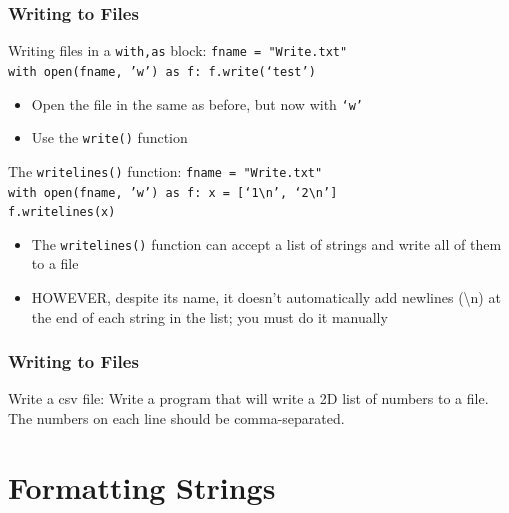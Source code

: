 \documentclass{beamer}
\newcommand{\code}[1]{\texttt{#1}}
\newcommand{\tab}{\hspace*{22pt}}
\begin{document}
\begin{frame}	
	\frametitle{Writing to Files}
	
	\begin{block}{Writing files in a \code{with,as} block:}
			\code{fname = "Write.txt" \\
					with open(fname, 'w') as f:
					\tab f.write(`test')
			}
		\endminipage\hfill
			\begin{itemize}
				\item Open the file in the same as before, but now with \code{`w'}
				\item Use the \code{write()} function
			\end{itemize}
		\endminipage\hfill
	\end{block}
	
	\begin{block}{The \code{writelines()} function:}
			\code{fname = "Write.txt" \\
					with open(fname, 'w') as f:
					\tab x = [`1\textbackslash n', `2\textbackslash n'] \\
					\tab f.writelines(x)
			}
		\endminipage\hfill
			\begin{itemize}
				\item The \code{writelines()} function can accept a list of strings and write all of them to a file
				\item HOWEVER, despite its name, it doesn't automatically add newlines (\textbackslash n) at the end of each string in the list; you must do it manually
			\end{itemize}
		\endminipage\hfill
	\end{block}
	
\end{frame}

\begin{frame}	
	\frametitle{Writing to Files}
	
	\begin{exampleblock}{Write a csv file:}
		Write a program that will write a 2D list of numbers to a file. The numbers on each line should be comma-separated.
	\end{exampleblock}
	
\end{frame}


\section{Formatting Strings}
\end{document}
